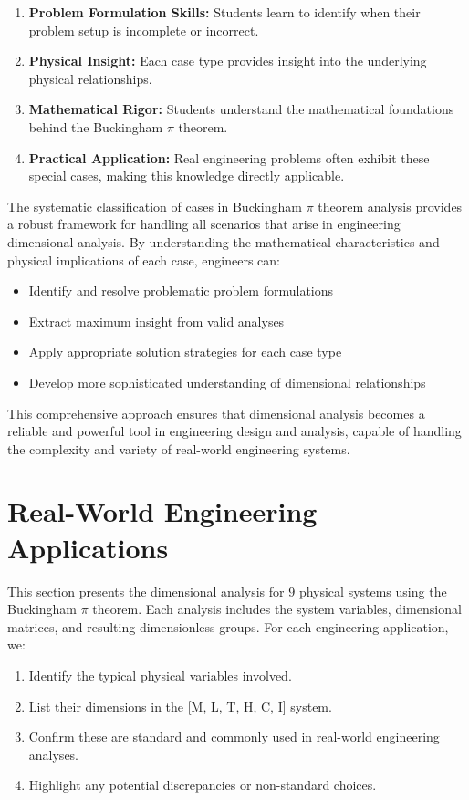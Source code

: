 \begin{enumerate}
    \item \textbf{Problem Formulation Skills:} Students learn to identify when their problem setup is incomplete or incorrect.
    \item \textbf{Physical Insight:} Each case type provides insight into the underlying physical relationships.
    \item \textbf{Mathematical Rigor:} Students understand the mathematical foundations behind the Buckingham $\pi$ theorem.
    \item \textbf{Practical Application:} Real engineering problems often exhibit these special cases, making this knowledge directly applicable.
\end{enumerate}

\begin{remarkbox}
\begin{remarkT}
The systematic classification of cases in Buckingham $\pi$ theorem analysis provides a robust framework for handling all scenarios that arise in engineering dimensional analysis. By understanding the mathematical characteristics and physical implications of each case, engineers can:

\begin{itemize}
    \item Identify and resolve problematic problem formulations
    \item Extract maximum insight from valid analyses
    \item Apply appropriate solution strategies for each case type
    \item Develop more sophisticated understanding of dimensional relationships
\end{itemize}

This comprehensive approach ensures that dimensional analysis becomes a reliable and powerful tool in engineering design and analysis, capable of handling the complexity and variety of real-world engineering systems.
\end{remarkT}
\end{remarkbox}

\section{Real-World Engineering Applications}\label{real-world}
        This section presents the dimensional analysis for $9$ physical systems using the Buckingham $\pi$ theorem. Each analysis includes the system variables, dimensional matrices, and resulting dimensionless groups.
        For each engineering application, we:
\begin{enumerate}
    \item Identify the typical physical variables involved.
    \item List their dimensions in the [M, L, T, H, C, I] system.
    \item Confirm these are standard and commonly used in real-world engineering analyses.
    \item Highlight any potential discrepancies or non-standard choices.
\end{enumerate}

